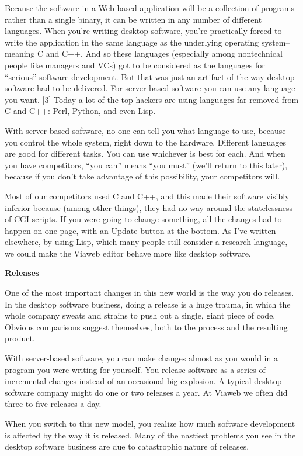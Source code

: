 Because the software in a Web-based application will be a collection of
programs rather than a single binary, it can be written in any number of
different languages. When you're writing desktop software, you're
practically forced to write the application in the same language as the
underlying operating system-- meaning C and C++. And so these languages
(especially among nontechnical people like managers and VCs) got to be
considered as the languages for ``serious'' software development. But
that was just an artifact of the way desktop software had to be
delivered. For server-based software you can use any language you want.
{[}3{]} Today a lot of the top hackers are using languages far removed
from C and C++: Perl, Python, and even Lisp.

With server-based software, no one can tell you what language to use,
because you control the whole system, right down to the hardware.
Different languages are good for different tasks. You can use whichever
is best for each. And when you have competitors, ``you can'' means ``you
must'' (we'll return to this later), because if you don't take advantage
of this possibility, your competitors will.

Most of our competitors used C and C++, and this made their software
visibly inferior because (among other things), they had no way around
the statelessness of CGI scripts. If you were going to change something,
all the changes had to happen on one page, with an Update button at the
bottom. As I've written elsewhere, by using \href{avg.html}{Lisp}, which
many people still consider a research language, we could make the Viaweb
editor behave more like desktop software.

\textbf{Releases}

One of the most important changes in this new world is the way you do
releases. In the desktop software business, doing a release is a huge
trauma, in which the whole company sweats and strains to push out a
single, giant piece of code. Obvious comparisons suggest themselves,
both to the process and the resulting product.

With server-based software, you can make changes almost as you would in
a program you were writing for yourself. You release software as a
series of incremental changes instead of an occasional big explosion. A
typical desktop software company might do one or two releases a year. At
Viaweb we often did three to five releases a day.

When you switch to this new model, you realize how much software
development is affected by the way it is released. Many of the nastiest
problems you see in the desktop software business are due to
catastrophic nature of releases.

